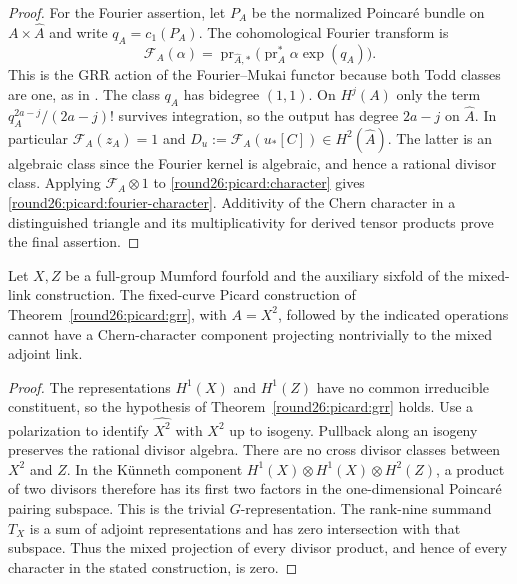 \begin{proof}
For the Fourier assertion, let $P_A$ be the normalized Poincar\'e
bundle on $A\times\widehat A$ and write $q_A=c_1(P_A)$. The
cohomological Fourier transform is
\[
 \mathcal F_A(\alpha)
  =\operatorname{pr}_{\widehat A,*}
      \bigl(\operatorname{pr}_A^*\alpha\exp(q_A)\bigr).
\]
This is the GRR action of the Fourier--Mukai functor because both
Todd classes are one, as in \cite[\S\S2,4]{Round26Mukai81}.
The class $q_A$ has bidegree $(1,1)$. On $H^j(A)$ only the term
$q_A^{2a-j}/(2a-j)!$ survives integration, so the output has degree
$2a-j$ on $\widehat A$. In particular
$\mathcal F_A(z_A)=1$ and
$D_u:=\mathcal F_A(u_*[C])\in H^2(\widehat A)$.
The latter is an algebraic class since the Fourier kernel is
algebraic, and hence a rational divisor class. Applying
$\mathcal F_A\otimes1$ to \eqref{round26:picard:character} gives
\eqref{round26:picard:fourier-character}. Additivity of the Chern character
in a distinguished triangle and its multiplicativity for derived
tensor products prove the final assertion.
\end{proof}

\begin{corollary}\label{round26:picard:mumford}
Let $X,Z$ be a full-group Mumford fourfold and the auxiliary sixfold
of the mixed-link construction. The fixed-curve Picard construction
of Theorem~\ref{round26:picard:grr}, with $A=X^2$, followed by the indicated
operations cannot have a Chern-character component projecting
nontrivially to the mixed adjoint link.
\end{corollary}

\begin{proof}
The representations $H^1(X)$ and $H^1(Z)$ have no common
irreducible constituent, so the hypothesis of
Theorem~\ref{round26:picard:grr} holds. Use a polarization to identify
$\widehat {X^2}$ with $X^2$ up to isogeny. Pullback along an isogeny
preserves the rational divisor algebra.
There are no cross divisor classes between $X^2$ and $Z$.
In the K\"unneth component
$H^1(X)\otimes H^1(X)\otimes H^2(Z)$, a product of two divisors
therefore has its first two factors in the one-dimensional
Poincar\'e pairing subspace. This is the trivial $G$-representation.
The rank-nine summand $T_X$ is a sum of adjoint representations
and has zero intersection with that subspace. Thus the mixed
projection of every divisor product, and hence of every character
in the stated construction, is zero.
\end{proof}

